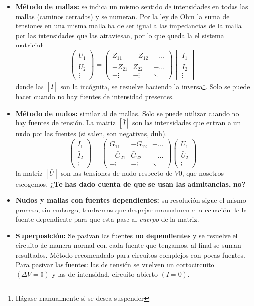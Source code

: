 \documentclass[a4paper, twocolumn, 10pt]{article}
\begin{document}
\begin{itemize}
	\item \textbf{Método de mallas:} se indica un mismo sentido de intensidades en todas las mallas (caminos cerrados) y se numeran. Por la ley de Ohm la suma de tensiones en una misma malla ha de ser igual a las impedancias de la malla por las intensidades que las atraviesan, por lo que queda la el sistema matricial: \[
	\begin{pmatrix}
		\bar{U}_1 \\
		\bar{U}_2 \\
		\vdots
	\end{pmatrix} = 
	\begin{pmatrix}
		\bar{Z}_{11}  & - \bar{Z}_{12} & -\dots \\
		-\bar{Z}_{21} & \bar{Z}_{22}   & -\dots \\
		-\vdots       & -\vdots        & \ddots
	\end{pmatrix}
	\begin{vmatrix}
	\bar{I}_1 \\
	\bar{I}_2 \\
	\vdots
	\end{vmatrix}
	\]
	donde las $[\bar{I}]$ son la incógnita, se resuelve haciendo la inversa\footnote{Hágase manualmente si se desea suspender}. Solo se puede hacer cuando no hay fuentes de intensidad presentes.
	\item \textbf{Método de nudos:} similar al de mallas. Solo se puede utilizar cuando no hay fuentes de tensión. La matriz $[\bar{I}]$ son las intensidades que entran a un nudo por las fuentes (si salen, son negativas, duh). \[
	\begin{pmatrix}
	\bar{I}_1 \\
	\bar{I}_2 \\
	\vdots
	\end{pmatrix} = 
	\begin{pmatrix}
	\bar{G}_{11} & - \bar{G}_{12} & -\dots \\
	-\bar{G}_{21} & \bar{G}_{22} & -\dots \\
	-\vdots & -\vdots & \ddots
	\end{pmatrix}
	\begin{pmatrix}
	\bar{U}_1 \\
	\bar{U}_2 \\
	\vdots
	\end{pmatrix}
	\]
	la matriz $[\bar{U}]$ son las tensiones de nudo respecto de $V0$, que nosotros escogemos. \textbf{¿Te has dado cuenta de que se usan las admitancias, no?}
	\item \textbf{Nudos y mallas con fuentes dependientes:} su resolución sigue el mismo proceso, sin embargo, tendremos que despejar manualmente la ecuación de la fuente dependiente para que esta pase al \textit{cuerpo} de la matriz.
	\item \textbf{Superposición:} Se pasivan las fuentes \textbf{no dependientes} y se resuelve el circuito de manera normal con cada fuente que tengamos, al final se suman resultados. Método recomendado para circuitos complejos con pocas fuentes. Para pasivar las fuentes: las de tensión se vuelven un cortocircuito $(\Delta V = 0)$ y las de intensidad, circuito abierto $(I = 0)$.
\end{itemize}
\end{document}
